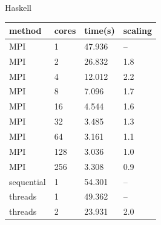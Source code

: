 \documentclass{tmr}
\begin{document}
\begin{figure}
\begin{minipage}[t]{0.5\linewidth}\centering
Haskell \\[3mm]
\begin{tabular}{|l|l|l|l|} \hline
method & cores & time(s) & scaling \\ \hline\hline
MPI & 1   & 47.936  & -- \\ \hline
MPI & 2   & 26.832  & 1.8 \\ \hline
MPI & 4   & 12.012  & 2.2 \\ \hline
MPI & 8   & 7.096   & 1.7 \\ \hline
MPI & 16  & 4.544   & 1.6 \\ \hline
MPI & 32  & 3.485   & 1.3 \\ \hline
MPI & 64  & 3.161   & 1.1 \\ \hline
MPI & 128 & 3.036   & 1.0 \\ \hline
MPI & 256 & 3.308   & 0.9 \\ \hline\hline
sequential & 1     & 54.301  & --  \\ \hline\hline
threads & 1    & 49.362  & -- \\ \hline
threads & 2    & 23.931  & 2.0 \\ \hline

\end{tabular}
\end{minipage}
\end{figure}
\end{document}
